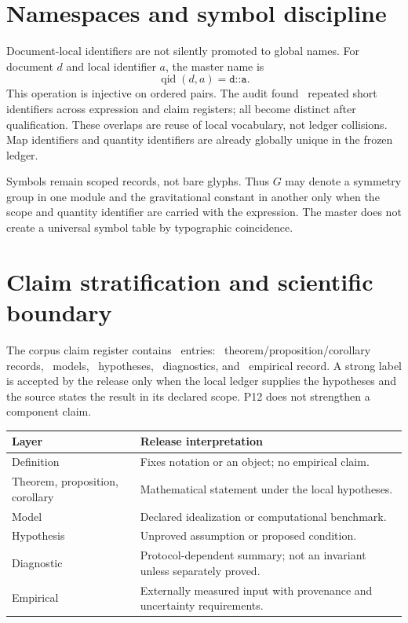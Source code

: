 \documentclass[11pt,a4paper]{article}
\theoremstyle{definition}
\theoremstyle{plain}
\theoremstyle{remark}
\begin{document}
\section{Namespaces and symbol discipline}

Document-local identifiers are not silently promoted to global names.
For document \(d\) and local identifier \(a\), the master name is
\begin{equation}
\operatorname{qid}(d,a)=\texttt{d::a}.
\end{equation}
This operation is injective on ordered pairs.  The audit found
\ShortIdentifierOverlapCount\ repeated short identifiers across
expression and claim registers; all become distinct after
qualification.  These overlaps are reuse of local vocabulary, not
ledger collisions.  Map identifiers and quantity identifiers are
already globally unique in the frozen ledger.

Symbols remain scoped records, not bare glyphs.  Thus \(G\) may denote
a symmetry group in one module and the gravitational constant in
another only when the scope and quantity identifier are carried with
the expression.  The master does not create a universal symbol table
by typographic coincidence.

\section{Claim stratification and scientific boundary}

The corpus claim register contains \ClaimCount\ entries:
\StrongClaimCount\ theorem/proposition/corollary records,
\ModelClaimCount\ models, \HypothesisClaimCount\ hypotheses,
\DiagnosticClaimCount\ diagnostics, and \EmpiricalClaimCount\ empirical
record.  A strong label is accepted by the release only when the local
ledger supplies the hypotheses and the source states the result in its
declared scope.  P12 does not strengthen a component claim.

\begin{center}
\begin{tabularx}{0.96\linewidth}{@{}L{49mm}Y@{}}
\toprule
Layer & Release interpretation\\
\midrule
Definition & Fixes notation or an object; no empirical claim.\\
Theorem, proposition, corollary & Mathematical statement under the local hypotheses.\\
Model & Declared idealization or computational benchmark.\\
Hypothesis & Unproved assumption or proposed condition.\\
Diagnostic & Protocol-dependent summary; not an invariant unless separately proved.\\
Empirical & Externally measured input with provenance and uncertainty requirements.\\
\bottomrule
\end{tabularx}
\end{center}
\end{document}
